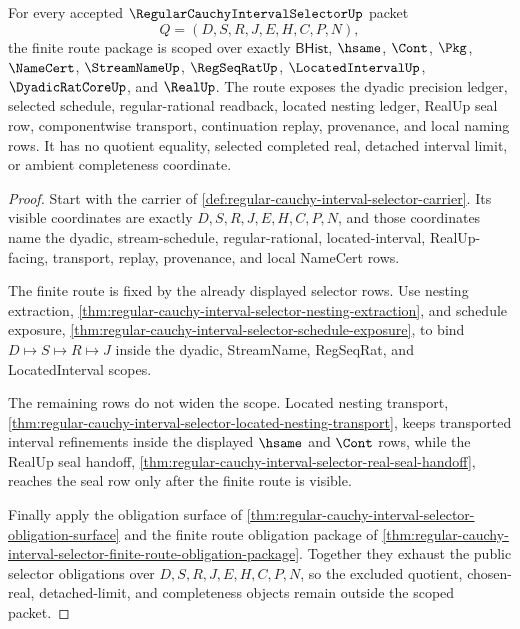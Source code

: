 \begin{theorem}
\label{thm:regular-cauchy-interval-selector-kernel-scope}
For every accepted $\RegularCauchyIntervalSelectorUp$ packet
$$
Q=(D,S,R,J,E,H,C,P,N),
$$
the finite route package is scoped over exactly $\mathsf{BHist}$, $\hsame$,
$\Cont$, $\Pkg$, $\NameCert$, $\StreamNameUp$, $\RegSeqRatUp$,
$\LocatedIntervalUp$, $\DyadicRatCoreUp$, and $\RealUp$. The route exposes the
dyadic precision ledger, selected schedule, regular-rational readback, located
nesting ledger, RealUp seal row, componentwise transport, continuation replay,
provenance, and local naming rows. It has no quotient equality, selected
completed real, detached interval limit, or ambient completeness coordinate.
\end{theorem}
\begin{proof}
Start with the carrier of
\autoref{def:regular-cauchy-interval-selector-carrier}. Its visible coordinates
are exactly $D,S,R,J,E,H,C,P,N$, and those coordinates name the dyadic,
stream-schedule, regular-rational, located-interval, RealUp-facing, transport,
replay, provenance, and local NameCert rows.

The finite route is fixed by the already displayed selector rows. Use nesting
extraction, \autoref{thm:regular-cauchy-interval-selector-nesting-extraction},
and schedule exposure,
\autoref{thm:regular-cauchy-interval-selector-schedule-exposure}, to bind
$D\mapsto S\mapsto R\mapsto J$ inside the dyadic, StreamName, RegSeqRat, and
LocatedInterval scopes.

The remaining rows do not widen the scope. Located nesting transport,
\autoref{thm:regular-cauchy-interval-selector-located-nesting-transport}, keeps
transported interval refinements inside the displayed $\hsame$ and $\Cont$ rows,
while the RealUp seal handoff,
\autoref{thm:regular-cauchy-interval-selector-real-seal-handoff}, reaches the
seal row only after the finite route is visible.

Finally apply the obligation surface of
\autoref{thm:regular-cauchy-interval-selector-obligation-surface} and the finite
route obligation package of
\autoref{thm:regular-cauchy-interval-selector-finite-route-obligation-package}.
Together they exhaust the public selector obligations over $D,S,R,J,E,H,C,P,N$,
so the excluded quotient, chosen-real, detached-limit, and completeness objects
remain outside the scoped packet.
\end{proof}



